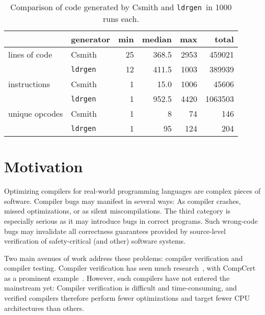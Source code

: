 \documentclass[a4paper]{easychair}
\newcommand\ldrgen{\texttt{ldrgen}}
\begin{document}
\begin{table}
\caption{Comparison of code generated by Csmith and \ldrgen\ in 1000 runs
each.}
\label{tab:results}

\centering
\begin{tabular}{l@{\ } | @{\ }l @{\quad} r @{\quad} r @{\quad} r @{\quad} r}

& generator & min & median & max & total \\
\hline
lines of code & Csmith
    & 25 & 368.5 & 2953 & 459021 \\
& \ldrgen
    & 12 & 411.5 & 1003 & 389939
    \\[1ex]
instructions & Csmith
    & 1 &  15.0 & 1006 &   45606 \\
& \ldrgen
    & 1 & 952.5 & 4420 & 1063503
    \\[1ex]
unique opcodes & Csmith
    & 1 &  8 &  74 & 146 \\
& \ldrgen
    & 1 & 95 & 124 & 204
    \\
% 
% 
\end{tabular}
\end{table}





\section{Motivation}

Optimizing compilers for real-world programming languages are complex pieces
of software. Compiler bugs may manifest in several ways: As compiler
crashes, missed optimizations, or as silent miscompilations. The third
category is especially serious as it may introduce bugs in correct programs.
Such wrong-code bugs may invalidate all correctness guarantees provided by
source-level verification of safety-critical (and other) software systems.

Two main avenues of work address these problems: compiler verification and
compiler testing. Compiler verification has seen much
research~\cite{dave-2003}, with Comp\-Cert as a prominent
example~\cite{leroy-2009}. However, such compilers have not entered the
mainstream yet: Compiler verification is difficult and time-consuming, and
verified compilers therefore perform fewer optimizations and target fewer
CPU architectures than others.
\end{document}
